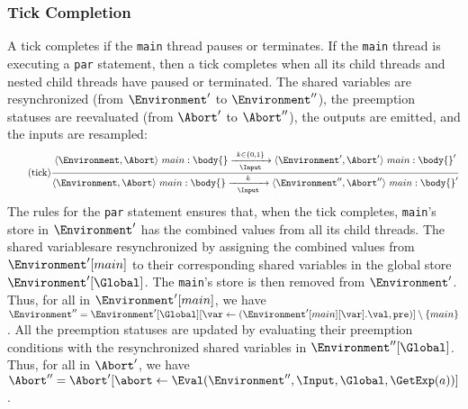 \subsubsection{Tick Completion}
A tick completes if the \verb$main$ thread pauses or terminates. 
If the \verb$main$ thread is executing a \verb$par$ statement, 
then a tick completes when all its child threads and nested 
child threads have paused or terminated. 
The shared variables are resynchronized (from $\Environment'$ to $\Environment''$), 
the preemption statuses are reevaluated (from $\Abort'$ to $\Abort''$), the outputs 
are emitted, and the inputs are resampled:
\begin{equation*}
	\tag{tick}
	\label{forec:tick}
	\frac{
			\langle \Environment, \Abort \rangle ~ main:\body{}
				\xrightarrow[~~\Input~~]{k \in \lbrace 0, 1 \rbrace} 
			\langle \Environment', \Abort' \rangle ~ main:\body{}'
		}{
			\langle \Environment, \Abort \rangle ~ main:\body{}
				\xrightarrow[~~\Input~~]{k} 
			\langle \Environment'', \Abort'' \rangle ~ main:\body{}'
		}
\end{equation*}
The rules for the \verb$par$ statement ensures that, 
when the tick completes,
\verb$main$'s store in $\Environment'$ has the combined 
values from all its child threads. The shared 
variables\footnotemark[6] are 
resynchronized by assigning the combined values from 
$\Environment'[main]$ to their corresponding 
shared variables in the global store $\Environment'[\Global]$. 
The \verb$main$'s store is then removed from 
$\Environment'$. Thus, for all \var{} in $\Environment'[main]$, we have 
$\Environment'' = \Environment'[\Global][\var \gets (\Environment'[main][\var].\val, \texttt{pre})] \setminus \{main\}$.
All the preemption statuses are updated by evaluating their preemption 
conditions with the resynchronized shared variables in 
$\Environment''[\Global]$. Thus, for all \abort{} in $\Abort'$, 
we have $\Abort'' = \Abort'[\abort \gets \Eval(\Environment'', \Input, \Global, \GetExp(a))]$.



